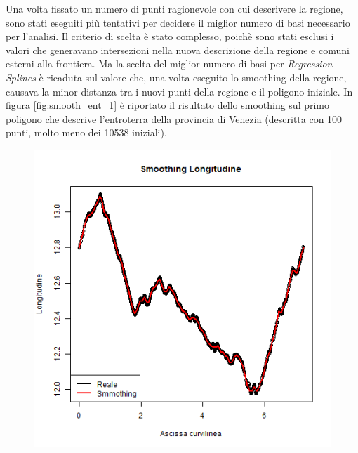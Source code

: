 \documentclass[a4paper,11pt,twoside,openright]{book}							%
\begin{document}
Una volta fissato un numero di punti ragionevole con cui descrivere la regione, sono stati eseguiti più tentativi per decidere il miglior numero di basi necessario per l'analisi. Il criterio di scelta è stato complesso, poichè sono stati esclusi i valori che generavano intersezioni nella nuova descrizione della regione e comuni esterni alla frontiera. Ma la scelta del miglior numero di basi per \textit{Regression Splines} è ricaduta sul valore che, una volta eseguito lo smoothing della regione, causava la minor distanza tra i nuovi punti della regione e il poligono iniziale. In figura \ref{fig:smooth_ent_1} è riportato il risultato dello smoothing sul primo poligono che descrive l'entroterra della provincia di Venezia (descritta con 100 punti, molto meno dei 10538 iniziali).  

\begin{figure}[!t]
\centering
\begin{minipage}{.32\textwidth}
\includegraphics[width=\textwidth]{Immagini/Longitudine.png}

\end{minipage}
\end{figure}
\end{document}
